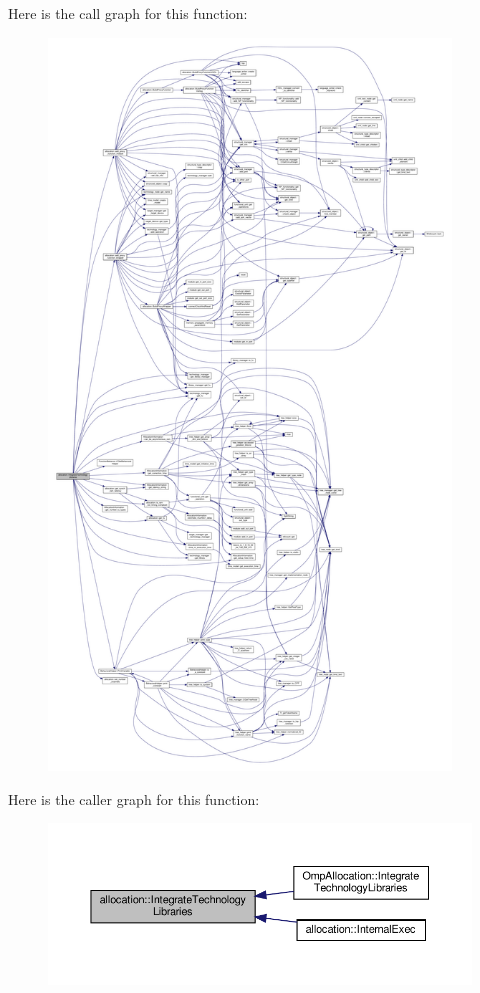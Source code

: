 Here is the call graph for this function\+:
\nopagebreak
\begin{figure}[H]
\begin{center}
\leavevmode
\includegraphics[height=550pt]{d0/d74/classallocation_a2a1bfe82ec889179c591b1ebee43464b_cgraph}
\end{center}
\end{figure}
Here is the caller graph for this function\+:
\nopagebreak
\begin{figure}[H]
\begin{center}
\leavevmode
\includegraphics[width=350pt]{d0/d74/classallocation_a2a1bfe82ec889179c591b1ebee43464b_icgraph}
\end{center}
\end{figure}
\mbox{\label{classallocation_a4bb8fddc280745e60af6840eec09d4ca}} 
